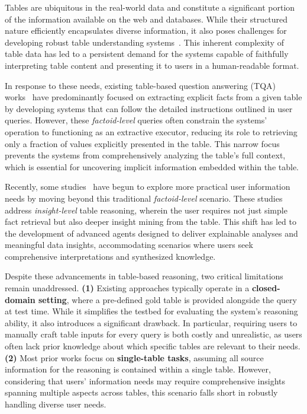

Tables are ubiquitous in the real-world data and constitute a significant portion of the information available on the web and databases. 
While their structured nature efficiently encapsulates diverse information, it also poses challenges for developing robust table understanding systems~\citep{pasupat-liang-2015-compositional,chen-etal-2020-hybridqa,tang2024strucbenchlargelanguagemodels,Seo2024UnveilingIT}.
This inherent complexity of table data has led to a persistent demand for the systems capable of faithfully interpreting table content and presenting it to users in a human-readable format.

In response to these needs, existing table-based question answering (TQA) works~\citep{pasupat-liang-2015-compositional,Nan2021FeTaQAFT,Wang2024ChainofTableET} have predominantly focused on extracting explicit facts from a given table by developing systems that can follow the detailed instructions outlined in user queries.
However, these \textit{factoid-level} queries often constrain the systems’ operation to functioning as an extractive executor, reducing its role to retrieving only a fraction of values explicitly presented in the table. 
This narrow focus prevents the systems from comprehensively analyzing the table’s full context, which is essential for uncovering  implicit information embedded within the table.


Recently, some studies~\citep{moosavi2021scigen,Zhao2023QTSummAN,Seo2024UnveilingIT} have begun to explore more practical user information needs by moving beyond this traditional \textit{factoid-level} scenario. 
These studies address \textit{insight-level} table reasoning, wherein the user requires not just simple fact retrieval but also deeper insight mining from the table. 
This shift has led to the development of advanced agents designed to deliver explainable analyses and meaningful data insights, accommodating scenarios where users seek comprehensive interpretations and synthesized knowledge.


Despite these advancements in table-based reasoning, two critical limitations remain unaddressed. 
\textbf{(1)} Existing approaches typically operate in a \textbf{closed-domain setting}, where a pre-defined gold table is provided alongside the query at test time. 
While it simplifies the testbed for evaluating the system's reasoning ability, it also introduces a significant drawback. 
In particular, requiring users to manually craft table inputs for every query is both costly and unrealistic, as users often lack prior knowledge about which specific tables are relevant to their needs.
\textbf{(2)} Most prior works focus on \textbf{single-table tasks}, assuming all source information for the reasoning is contained within a single table.
However, considering that users' information needs may require comprehensive insights spanning multiple aspects across tables, this scenario falls short in robustly handling diverse user needs.

